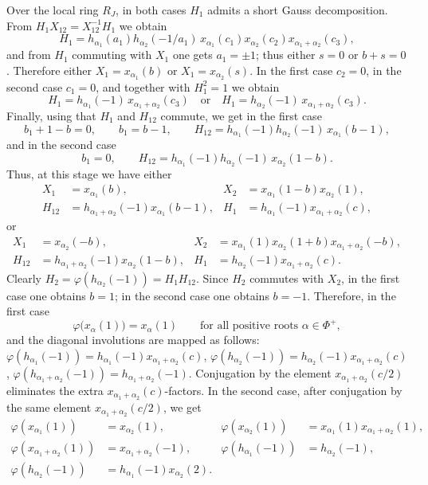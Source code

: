 \documentclass[]{jgcc}
\numberwithin{equation}{section}
\begin{document}
Over the local ring $R_J$, in both cases $H_1$ admits a short Gauss decomposition.
From $H_1X_{12}=X_{12}^{-1}H_1$ we obtain
\[
H_1=h_{\alpha_1}(a_1)h_{\alpha_2}(-1/a_1)\,x_{\alpha_1}(c_1)x_{\alpha_2}(c_2)x_{\alpha_1+\alpha_2}(c_3),
\]
and from $H_1$ commuting with $X_1$ one gets $a_1=\pm1$; thus either $s=0$ or $b+s=0$.
Therefore either $X_1=x_{\alpha_1}(b)$ or $X_1=x_{\alpha_2}(s)$.
In the first case $c_2=0$, in the second case $c_1=0$, and together with $H_1^2=1$ we obtain
\[
H_1=h_{\alpha_1}(-1)\,x_{\alpha_1+\alpha_2}(c_3)
\quad\text{or}\quad
H_1=h_{\alpha_2}(-1)\,x_{\alpha_1+\alpha_2}(c_3).
\]
Finally, using that $H_1$ and $H_{12}$ commute, we get in the first case
\[
b_1+1-b=0,\qquad b_1=b-1,\qquad
H_{12}=h_{\alpha_1}(-1)h_{\alpha_2}(-1)\,x_{\alpha_1}(b-1),
\]
and in the second case
\[
b_1=0,\qquad
H_{12}=h_{\alpha_1}(-1)h_{\alpha_2}(-1)\,x_{\alpha_2}(1-b).
\]
Thus, at this stage we have either
\begin{align*}
X_1&=x_{\alpha_1}(b),& X_2&=x_{\alpha_1}(1-b)x_{\alpha_2}(1),\\
H_{12}&=h_{\alpha_1+\alpha_2}(-1)x_{\alpha_1}(b-1),& H_1&=h_{\alpha_1}(-1)x_{\alpha_1+\alpha_2}(c),
\end{align*}
or
\begin{align*}
X_1&=x_{\alpha_2}(-b),& X_2&=x_{\alpha_1}(1)x_{\alpha_2}(1+b)x_{\alpha_1+\alpha_2}(-b),\\
H_{12}&=h_{\alpha_1+\alpha_2}(-1)x_{\alpha_2}(1-b),& H_1&=h_{\alpha_2}(-1)x_{\alpha_1+\alpha_2}(c).
\end{align*}
Clearly $H_2=\varphi(h_{\alpha_2}(-1))=H_1H_{12}$.
Since $H_2$ commutes with $X_2$, in the first case one obtains $b=1$; in the second case one obtains $b=-1$.
Therefore, in the first case
\[
\varphi\bigl(x_{\alpha}(1)\bigr)=x_{\alpha}(1)
\qquad\text{for all positive roots }\alpha\in\Phi^+,
\]
and the diagonal involutions are mapped as follows:
$\varphi(h_{\alpha_1}(-1))=h_{\alpha_1}(-1)x_{\alpha_1+\alpha_2}(c)$,
$\varphi(h_{\alpha_2}(-1))=h_{\alpha_2}(-1)x_{\alpha_1+\alpha_2}(c)$,
$\varphi(h_{\alpha_1+\alpha_2}(-1))=h_{\alpha_1+\alpha_2}(-1)$.
Conjugation by the element $x_{\alpha_1+\alpha_2}(c/2)$ eliminates the extra
$x_{\alpha_1+\alpha_2}(c)$-factors.
In the second case, after conjugation by the same element $x_{\alpha_1+\alpha_2}(c/2)$, we get
\begin{align*}
    \varphi(x_{\alpha_1}(1))&=x_{\alpha_2}(1),&
    \varphi(x_{\alpha_2}(1))&=x_{\alpha_1}(1)x_{\alpha_1+\alpha_2}(1),\\
    \varphi(x_{\alpha_1+\alpha_2}(1))&=x_{\alpha_1+\alpha_2}(-1),&
    \varphi(h_{\alpha_1}(-1))&=h_{\alpha_2}(-1),\\
     \varphi(h_{\alpha_2}(-1))&=h_{\alpha_1}(-1)x_{\alpha_2}(2).
\end{align*}
\end{document}
